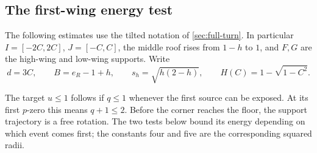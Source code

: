 \subsection{The first-wing energy test}
\label{app:first-wing-energy}

The following estimates use the tilted notation of
\cref{sec:full-turn}. In particular $I=[-2C,2C]$, $J=[-C,C]$,
the middle roof rises from $1-h$ to $1$, and $F,G$ are the
high-wing and low-wing supports. Write
\[
 d=3C,\qquad B=e_R-1+h,\qquad
 s_h=\sqrt{h(2-h)},\qquad H(C)=1-\sqrt{1-C^2}.
\]

The target $u\le1$ follows if $q\le1$ whenever the first source can
be exposed. At its first $p$-zero this means $q+1\le2$. Before the
corner reaches the floor, the support trajectory is a free rotation.
The two tests below bound its energy depending on which event comes
first; the constants four and five are the corresponding squared
radii.

